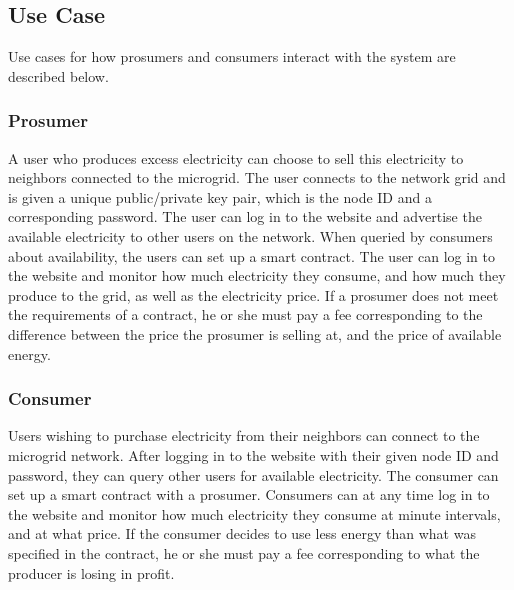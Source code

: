 
\subsection{Use Case}
Use cases for how prosumers and consumers interact with the system are described below.
\subsubsection*{Prosumer}
A user who produces excess electricity can choose to sell this electricity to neighbors connected to the microgrid. The user connects to the network grid and is given a unique public/private key pair, which is the node ID and a corresponding password. The user can log in to the website and advertise the available electricity to other users on the network. When queried by consumers about availability, the users can set up a smart contract. The user can log in to the website and monitor how much electricity they consume, and how much they produce to the grid, as well as the electricity price. If a prosumer does not meet the requirements of a contract, he or she must pay a fee corresponding to the difference between the price the prosumer is selling at, and the price of available energy.


\subsubsection*{Consumer}
Users wishing to purchase electricity from their neighbors can connect to the microgrid network. After logging in to the website with their given node ID and password, they can query other users for available electricity. The consumer can set up a smart contract with a prosumer. Consumers can at any time log in to the website and monitor how much electricity they consume at minute intervals, and at what price. If the consumer decides to use less energy than what was specified in the contract, he or she must pay a fee corresponding to what the producer is losing in profit.


